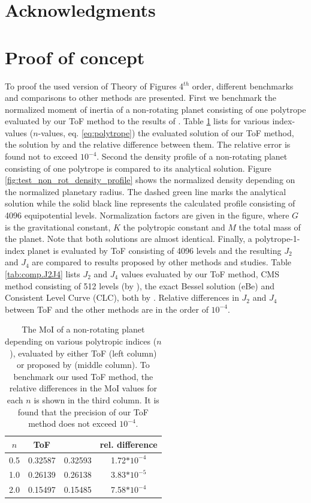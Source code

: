\documentclass[usenatbib]{mnras}
\begin{document}
\section{Acknowledgments}

\setlength{\bibhang}{1.6em}
\setlength{}


\normalsize

\appendix
\section{Proof of concept}
To proof the used version of Theory of Figures 4$^{th}$ order, different benchmarks and comparisons to other methods are presented. 
First we benchmark the normalized moment of inertia of a non-rotating planet consisting of one polytrope evaluated by our ToF method to the results of \cite{Lattimer_2001}. Table \ref{tab:comp.MoI} lists for various index-values ($n$-values, eq. \ref{eq:polytrope}) the evaluated solution of our ToF method, the solution by \cite{Lattimer_2001} and the relative difference between them. The relative error is found not to exceed $10^{-4}$. 
Second the density profile of a non-rotating planet consisting of one polytrope is compared to its analytical solution. Figure \ref{fig:test_non_rot_density_profile} shows the normalized density depending on the normalized planetary radius. The dashed green line marks the analytical solution while the solid black line represents the calculated profile consisting of 4096 equipotential levels. Normalization factors are given in the figure, where $G$ is the gravitational constant, $K$ the polytropic constant and $M$ the total mass of the planet. Note that both solutions are almost identical.
Finally, a polytrope-1-index planet is evaluated by ToF consisting of 4096 levels and the resulting $J_2$ and $J_4$  are compared to results proposed by other methods and studies. Table \ref{tab:comp.J2J4} lists $J_2$ and $J_4$ values evaluated by our ToF method, CMS method consisting of 512 levels (by \cite{Hubbard_2013}), the exact Bessel solution (eBe) and Consistent Level Curve (CLC), both by \cite{Wisdom_2016}. Relative differences in $J_2$ and $J_4$ between ToF and the other methods are in the order of $10^{-4}$.

\begin{table}
\centering
 \begin{tabular}{c| c c c}
$n$ & ToF & \cite{Lattimer_2001} & rel. difference \\
 \hline
0.5 & 0.32587  & 0.32593 & 1.72$*10^{-4}$ \\
1.0 & 0.26139 & 0.26138 & 3.83$*10^{-5}$ \\
2.0 & 0.15497 & 0.15485 & 7.58$*10^{-4}$ \\
 \end{tabular}
\caption{The MoI of a non-rotating planet depending on various polytropic indices ($n$), evaluated by either ToF (left column) or proposed by \cite{Lattimer_2001} (middle column). To benchmark our used ToF method, the relative differences in the MoI values for each $n$ is shown in the third column. It is found that the precision of our ToF method does not exceed $10^{-4}$. }
\label{tab:comp.MoI}
\end{table}
\end{document}
